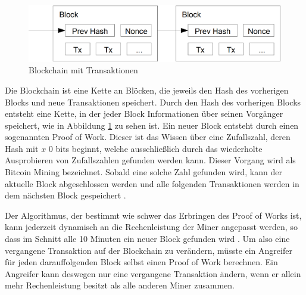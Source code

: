 \documentclass{scrreprt}
\begin{document}
\begin{figure}
    \centering
    \label{fig:btc_blockchain}
    \includegraphics[width=0.5\linewidth]{BitcoinBlockchain.png}
    \caption{Blockchain mit Transaktionen \cite{btc-nakamoto2008bitcoin}}
\end{figure}

Die Blockchain ist eine Kette an Blöcken, die jeweils den Hash des vorherigen Blocks und neue Transaktionen speichert. Durch den Hash des vorherigen Blocks entsteht eine Kette, in der jeder Block Informationen über seinen Vorgänger speichert, wie in Abbildung \ref{fig:btc_blockchain} zu sehen ist. Ein neuer Block entsteht durch einen sogenannten Proof of Work. Dieser ist das Wissen über eine Zufallszahl, deren Hash mit $x$ 0 bits beginnt, welche ausschließlich durch das wiederholte Ausprobieren von Zufallszahlen gefunden werden kann. Dieser Vorgang wird als Bitcoin Mining bezeichnet. Sobald eine solche Zahl gefunden wird, kann der aktuelle Block abgeschlossen werden und alle folgenden Transaktionen werden in dem nächsten Block gespeichert \cite{btc-nakamoto2008bitcoin}.

Der Algorithmus, der bestimmt wie schwer das Erbringen des Proof of Works ist, kann jederzeit dynamisch an die Rechenleistung der Miner angepasst werden, so dass im Schnitt alle 10 Minuten ein neuer Block gefunden wird \cite{btc-Zaghloul2019Bitcoin}. Um also eine vergangene Transaktion auf der Blockchain zu verändern, müsste ein Angreifer für jeden darauffolgenden Block selbst einen Proof of Work berechnen. Ein Angreifer kann deswegen nur eine vergangene Transaktion ändern, wenn er allein mehr Rechenleistung besitzt als alle anderen Miner zusammen. \\
\end{document}
